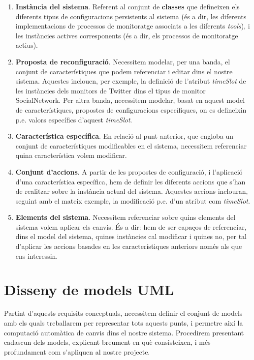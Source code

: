 \begin{enumerate}
\item \textbf{Instància del sistema}. Referent al conjunt de \textbf{classes} que defineixen els diferents tipus de configuracions persistents al sistema (és a dir, les diferents implementacions de processos de monitoratge associats a les diferents \textit{tools}), i les instàncies actives corresponents (és a dir, els processos de monitoratge actius).
\item \textbf{Proposta de reconfiguració}. Necessitem modelar, per una banda, el conjunt de característiques que podem referenciar i editar dins el nostre sistema. Aquestes inclouen, per exemple, la definició de l'atribut \textit{timeSlot} de les instàncies dels monitors de Twitter dins el tipus de monitor SocialNetwork. Per altra banda, necessitem modelar, basat en aquest model de característiques, propostes de configuracions específiques, on es defineixin p.e. valors específics d'aquest \textit{timeSlot}.
\item \textbf{Característica específica}. En relació al punt anterior, que engloba un conjunt de característiques modificables en el sistema, necessitem referenciar quina característica volem modificar.
\item \textbf{Conjunt d'accions}. A partir de les propostes de configuració, i l'aplicació d'una característica específica, hem de definir les diferents accions que s'han de realitzar sobre la instància actual del sistema. Aquestes accions inclouran, seguint amb el mateix exemple, la modificació p.e. d'un atribut com \textit{timeSlot}.
\item \textbf{Elements del sistema}. Necessitem referenciar sobre quins elements del sistema volem aplicar els canvis. És a dir: hem de ser capaços de referenciar, dins el model del sistema, quines instàncies cal modificar i quines no, per tal d'aplicar les accions basades en les característiques anteriors només als que ens interessin.
\end{enumerate}

\section{Disseny de models UML}

Partint d'aquests requisits conceptuals, necessitem definir el conjunt de models amb els quals treballarem per representar tots aquests punts, i permetre així la computació automàtica de canvis dins el nostre sistema. Procedirem presentant cadascun dels models, explicant breument en què consisteixen, i més profundament com s'apliquen al nostre projecte.\\

